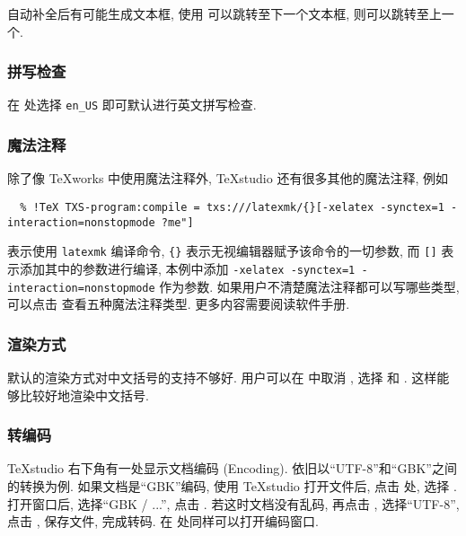 自动补全后有可能生成文本框,
使用 \keys{\ctrl + \arrowkey{>}} 可以跳转至下一个文本框,
\keys{\ctrl + \arrowkey{<}} 则可以跳转至上一个. 

\subsubsection{拼写检查}

在
处选择 \texttt{en\_US} 即可默认进行英文拼写检查.

\subsubsection{魔法注释}

除了像 \TeX works 中使用魔法注释外, \TeX studio 还有很多其他的魔法注释, 例如
\begin{lstlisting}
  % !TeX TXS-program:compile = txs:///latexmk/{}[-xelatex -synctex=1 -interaction=nonstopmode ?me"]
\end{lstlisting}
表示使用 \texttt{latexmk} 编译命令,
\texttt{\{\}} 表示无视编辑器赋予该命令的一切参数,
而 \texttt{[]} 表示添加其中的参数进行编译,
本例中添加 \texttt{-xelatex -synctex=1 -interaction=nonstopmode} 作为参数.
如果用户不清楚魔法注释都可以写哪些类型,
可以点击  查看五种魔法注释类型.
更多内容需要阅读软件手册.

\subsubsection{渲染方式}

默认的渲染方式对中文括号的支持不够好. 
用户可以在  中取消
,
选择  和 .
这样能够比较好地渲染中文括号. 

\subsubsection{转编码}

\TeX studio 右下角有一处显示文档编码 (Encoding). 
依旧以``UTF-8''和``GBK''之间的转换为例. 
如果文档是``GBK''编码, 使用 \TeX studio 打开文件后,
点击  处, 选择 .
打开窗口后, 选择``GBK / ...'', 点击 .
若这时文档没有乱码, 再点击 ,
选择``UTF-8'', 点击 , 保存文件, 完成转码.
在  处同样可以打开编码窗口.

